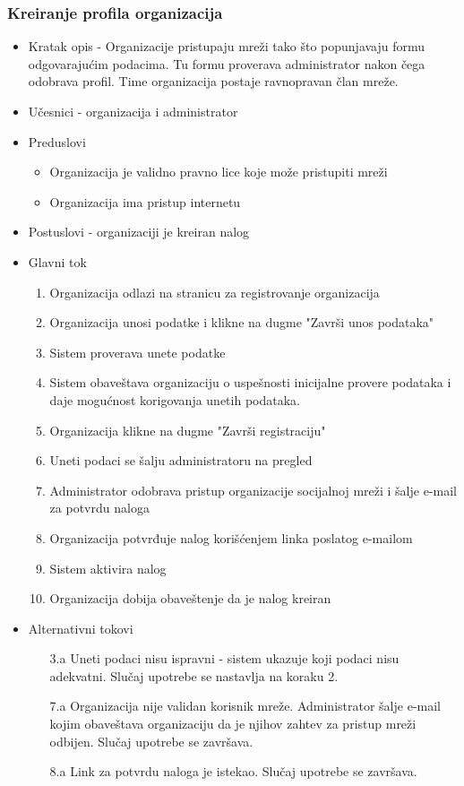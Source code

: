 \subsubsection{Kreiranje profila organizacija}
\begin{itemize}
	\item Kratak opis - Organizacije pristupaju mreži tako što popunjavaju formu odgovarajućim podacima. Tu formu proverava administrator nakon čega odobrava profil. Time organizacija postaje ravnopravan član mreže.
	\item Učesnici - organizacija i administrator
	\item Preduslovi
	\begin{itemize}
		\item Organizacija je validno pravno lice koje može pristupiti mreži 
		\item Organizacija ima pristup internetu
	\end{itemize}
	\item Postuslovi - organizaciji je kreiran nalog
	\item Glavni tok
	\begin{enumerate}
		\item Organizacija odlazi na stranicu za registrovanje organizacija
		\item Organizacija unosi podatke i klikne na dugme "Završi unos podataka"
		\item Sistem proverava unete podatke
		\item Sistem obaveštava organizaciju o uspešnosti inicijalne provere podataka i daje mogućnost korigovanja unetih podataka.
		\item Organizacija klikne na dugme "Završi registraciju"
		\item Uneti podaci se šalju administratoru na pregled
		\item Administrator odobrava pristup organizacije socijalnoj mreži i šalje e-mail za potvrdu naloga
		\item Organizacija potvrđuje nalog korišćenjem linka poslatog e-mailom
		\item Sistem aktivira nalog
		\item Organizacija dobija obaveštenje da je nalog kreiran
	\end{enumerate}
	\item Alternativni tokovi
	\begin{itemize}
		\item[3.a] Uneti podaci nisu ispravni - sistem ukazuje koji podaci nisu adekvatni. Slučaj upotrebe se nastavlja na koraku 2.
		\item[7.a] Organizacija nije validan korisnik mreže. Administrator šalje e-mail kojim obaveštava organizaciju da je njihov zahtev za pristup mreži odbijen. Slučaj upotrebe se završava.
		\item[8.a] Link za potvrdu naloga je istekao. Slučaj upotrebe se završava.
	\end{itemize}
\end{itemize}


